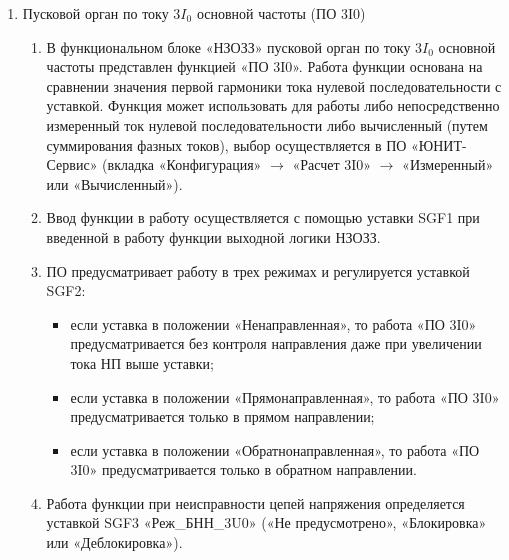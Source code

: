 \begin{enumerate}
\begin{enumerate}
\item
Функциональный блок «НЗОЗЗ» может быть полностью выведен из работы оперативно путем активации сигнала «ОВ НЗОЗЗ».
\item
В таблице \ref{nzozz:tbl1} приведены параметры, необходимые для настройки НЗОЗЗ.

\end{enumerate}


\item Пусковой орган по току $3I_0$ основной частоты (ПО 3I0)

\begin{enumerate}


\item
В функциональном блоке «НЗОЗЗ» пусковой орган по току $3I_0$ основной частоты представлен функцией «ПО 3I0». Работа функции основана на сравнении значения первой гармоники тока нулевой последовательности с уставкой. Функция может использовать для работы либо непосредственно измеренный ток нулевой последовательности либо вычисленный (путем суммирования фазных токов), выбор осуществляется в ПО «ЮНИТ-Сервис» (вкладка «Конфигурация» $\rightarrow$  «Расчет 3I0» $\rightarrow$  «Измеренный» или «Вычисленный»).

\item
Ввод функции в работу осуществляется с помощью уставки SGF1 при введенной в работу функции выходной логики НЗОЗЗ.

\item
ПО предусматривает работу в трех режимах и регулируется уставкой SGF2:
\begin{itemize}
\item если уставка в положении «Ненаправленная», то работа «ПО 3I0» предусматривается без контроля направления даже при увеличении тока НП выше уставки;
\item если уставка в положении «Прямонаправленная», то работа «ПО 3I0» предусматривается только в прямом направлении;
\item если уставка в положении «Обратнонаправленная», то работа «ПО 3I0» предусматривается только в обратном направлении.
\end{itemize}

\item\sloppy
Работа функции при неисправности цепей напряжения определяется уставкой SGF3 «Реж\_БНН\_3U0» («Не предусмотрено», «Блокировка» или «Деблокировка»).


\end{enumerate}
\end{enumerate}
